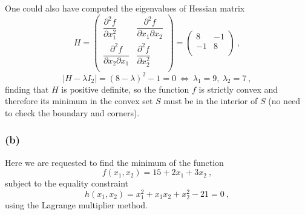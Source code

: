 \documentclass[12pt,titlepage]{article}
\begin{document}
One could also have computed the eigenvalues of Hessian matrix
\[
H = 
\begin{pmatrix}
\dfrac{\partial^2 f}{\partial x_1^2} & \dfrac{\partial^2 f}{\partial x_1 \partial x_2} \\
\dfrac{\partial^2 f}{\partial x_2 \partial x_1} & \dfrac{\partial^2 f}{\partial x_2^2} \\
 \end{pmatrix} =
 \begin{pmatrix}
8 & -1 \\
-1 & 8 \\
 \end{pmatrix} \ ,
\]
\[
|H-\lambda I_2| = (8-\lambda)^2 -1 = 0 \ \Leftrightarrow \ \lambda_1 = 9, \ \lambda_2 = 7 \ ,
\]
finding that $H$ is positive definite, so the function $f$ is strictly convex and therefore its minimum in the convex set $S$ must be in the interior of $S$ (no need to check the boundary and corners). 

\subsubsection*{(b)}
Here we are requested to find the minimum of the function 
\begin{equation}
f(x_1, x_2) = 15 + 2x_1 + 3x_2 \ ,
\end{equation}
subject to the equality constraint
\begin{equation}
h(x_1, x_2) = x_1^2 + x_1 x_2 +x_2^2 - 21 = 0 \ ,
\end{equation}
using the Lagrange multiplier method.
\end{document}
